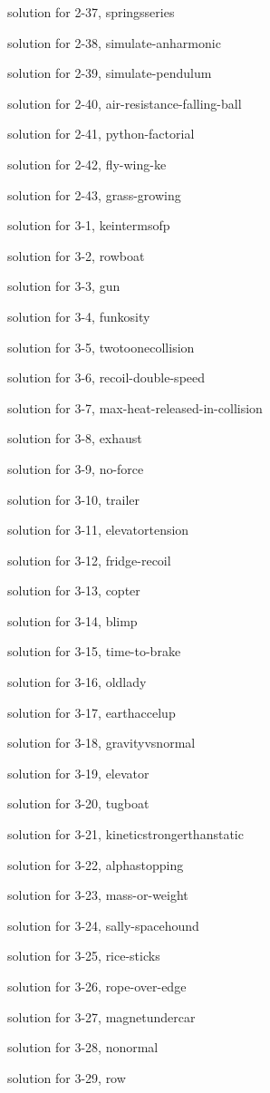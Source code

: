 \documentclass{problems}
\begin{document}
solution for 2-37, springsseries

solution for 2-38, simulate-anharmonic

solution for 2-39, simulate-pendulum

solution for 2-40, air-resistance-falling-ball

solution for 2-41, python-factorial

solution for 2-42, fly-wing-ke

solution for 2-43, grass-growing

solution for 3-1, keintermsofp

solution for 3-2, rowboat

solution for 3-3, gun

solution for 3-4, funkosity

solution for 3-5, twotoonecollision

solution for 3-6, recoil-double-speed

solution for 3-7, max-heat-released-in-collision

solution for 3-8, exhaust

solution for 3-9, no-force

solution for 3-10, trailer

solution for 3-11, elevatortension

solution for 3-12, fridge-recoil

solution for 3-13, copter

solution for 3-14, blimp

solution for 3-15, time-to-brake

solution for 3-16, oldlady

solution for 3-17, earthaccelup

solution for 3-18, gravityvsnormal

solution for 3-19, elevator

solution for 3-20, tugboat

solution for 3-21, kineticstrongerthanstatic

solution for 3-22, alphastopping

solution for 3-23, mass-or-weight

solution for 3-24, sally-spacehound

solution for 3-25, rice-sticks

solution for 3-26, rope-over-edge

solution for 3-27, magnetundercar

solution for 3-28, nonormal

solution for 3-29, row
\end{document}
